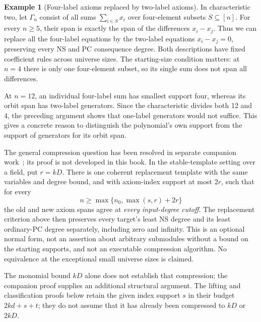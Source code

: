 \documentclass[11pt,a4paper,oneside,openany]{book}
\theoremstyle{definition}\newtheorem{definition}[theorem]{Definition}
\newtheorem{example}[theorem]{Example}
\theoremstyle{remark}\newtheorem{remark}[theorem]{Remark}
\numberwithin{equation}{chapter}
\begin{document}
\begin{example}[Four-label axioms replaced by two-label axioms]\label{tx:eg:four-to-two}
In characteristic two, let $\Gamma_n$ consist of all sums
$\sum_{i\in S}x_i$ over four-element subsets $S\subseteq[n]$.
For every $n\ge5$, their span is exactly the span of the differences
$x_i-x_j$. Thus we can replace all the four-label equations by the
two-label equations $x_i-x_j=0$, preserving every NS and PC consequence
degree. Both descriptions have fixed coefficient rules across universe sizes.
The starting-size condition matters: at $n=4$ there is only one
four-element subset, so its single sum does not span all differences.

At $n=12$, an individual four-label sum has smallest support four,
whereas its orbit span has two-label generators. Since the characteristic
divides both 12 and 4, the preceding argument shows that one-label
generators would not suffice. This gives a concrete reason to distinguish
the polynomial's own support from the support of generators for its
orbit span.
\end{example}

The general compression question has been resolved in separate
companion work~\cite{CompressionCompanion}; its proof is not developed
in this book. In the stable-template setting over a field, put $r=kD$.
There is one coherent replacement template with the same variables
and degree bound, and with axiom-index support at most $2r$, such that
for every
\[
                  n\ge\max\{n_0,\max(s,r)+2r\}
\]
the old and new axiom spans agree at \emph{every input-degree cutoff}.
The replacement criterion above then preserves every target's least
NS degree and its least ordinary-PC degree separately, including zero
and infinity. This is an optional normal form, not an assertion about
arbitrary submodules without a bound on the starting supports, and not
an executable compression algorithm. No equivalence at the exceptional
small universe sizes is claimed.

The monomial bound $kD$ alone does not establish that compression;
the companion proof supplies an additional structural argument.
The lifting and classification proofs below retain the given index
support $s$ in their budget $2kd+s+t$; they do not assume that it has
already been compressed to $kD$ or $2kD$.
\end{document}
